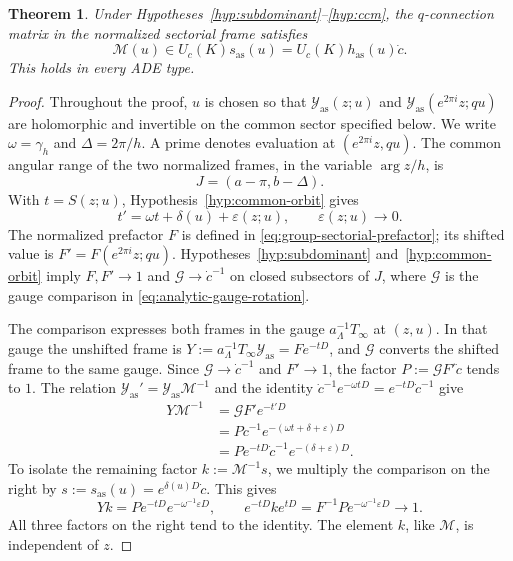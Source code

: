 \documentclass[11pt,leqno]{amsart}
\numberwithin{equation}{section}
\theoremstyle{plain}
\newtheorem{theorem}{Theorem}[section]
\theoremstyle{definition}
\theoremstyle{plain}
\theoremstyle{definition}
\theoremstyle{remark}
\begin{document}
\begin{theorem}\label{prop:analytic-sectorial-Steinberg}\label{prop:sectorial-Steinberg}
Under Hypotheses~\ref{hyp:subdominant}--\ref{hyp:ccm}, the $q$-connection matrix in the normalized sectorial frame satisfies
\begin{equation}\label{eq:reference-sectorial-Steinberg}
 \mathscr M(u)\in U_c(K)s_{\mathrm{as}}(u)
 =U_c(K)h_{\mathrm{as}}(u)\dot c.
\end{equation}
This holds in every ADE type.
\end{theorem}
\begin{proof}
Throughout the proof, $u$ is chosen so that $\mathcal Y_{\mathrm{as}}(z;u)$ and $\mathcal Y_{\mathrm{as}}(e^{2\pi i}z;qu)$ are holomorphic and invertible on the common sector specified below.  We write $\omega=\gamma_h$ and $\Delta=2\pi/h$.  A prime denotes evaluation at $(e^{2\pi i}z,qu)$.  The common angular range of the two normalized frames, in the variable $\arg z/h$, is
\[
 J=(a-\pi,b-\Delta).
\]
With $t=S(z;u)$, Hypothesis~\ref{hyp:common-orbit} gives
\[
 t'=\omega t+\delta(u)+\varepsilon(z;u),
 \qquad \varepsilon(z;u)\longrightarrow0.
\]
The normalized prefactor $F$ is defined in \eqref{eq:group-sectorial-prefactor}; its shifted value is $F'=F(e^{2\pi i}z;qu)$.  Hypotheses~\ref{hyp:subdominant} and~\ref{hyp:common-orbit} imply $F,F'\to1$ and $\mathcal G\to\dot c^{-1}$ on closed subsectors of $J$, where $\mathcal G$ is the gauge comparison in \eqref{eq:analytic-gauge-rotation}.

The comparison expresses both frames in the gauge $a_\Lambda^{-1}T_\infty$ at $(z,u)$.  In that gauge the unshifted frame is $Y:=a_\Lambda^{-1}T_\infty\mathcal Y_{\mathrm{as}}=Fe^{-tD}$, and $\mathcal G$ converts the shifted frame to the same gauge.  Since $\mathcal G\to\dot c^{-1}$ and $F'\to1$, the factor $P:=\mathcal G F'\dot c$ tends to $1$.  The relation $\mathcal Y_{\mathrm{as}}'=\mathcal Y_{\mathrm{as}}\mathscr M^{-1}$ and the identity $\dot c^{-1}e^{-\omega tD}=e^{-tD}\dot c^{-1}$ give
\[
 \begin{aligned}
 Y\mathscr M^{-1}
 &=\mathcal G F'e^{-t'D}\\
 &=P\dot c^{-1}e^{-(\omega t+\delta+\varepsilon)D}\\
 &=Pe^{-tD}\dot c^{-1}e^{-(\delta+\varepsilon)D}.
 \end{aligned}
\]
To isolate the remaining factor $k:=\mathscr M^{-1}s$, we multiply the comparison on the right by $s:=s_{\mathrm{as}}(u)=e^{\delta(u)D}\dot c$.  This gives
\[
 Yk=Pe^{-tD}e^{-\omega^{-1}\varepsilon D},
 \qquad
 e^{-tD}ke^{tD}=F^{-1}Pe^{-\omega^{-1}\varepsilon D}\longrightarrow1.
\]
All three factors on the right tend to the identity.  The element $k$, like $\mathscr M$, is independent of $z$.


\end{proof}
\end{document}
